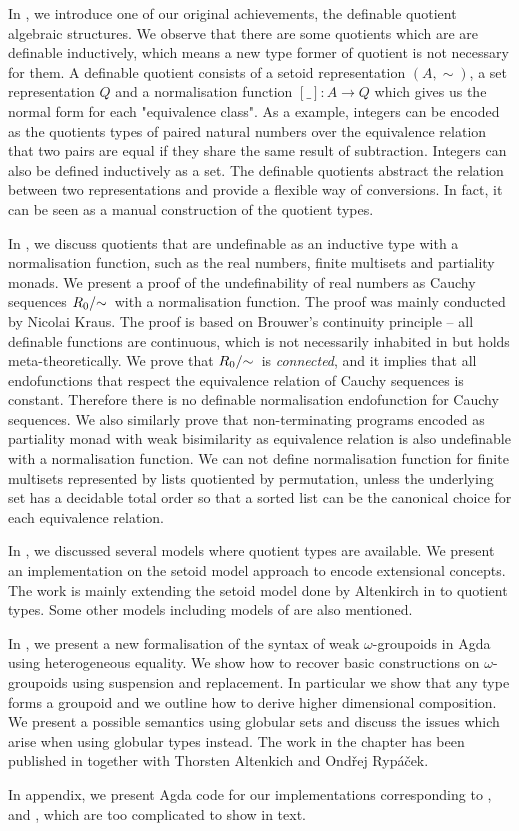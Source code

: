 In , we introduce one of our original achievements, the definable quotient algebraic structures. We observe that there are some quotients which are are definable inductively, which means a new type former of quotient is not necessary for them. A definable quotient consists of a setoid representation $(A, \sim)$, a set representation $Q$ and a normalisation function $[\_] : A \to Q$ which gives us the normal form for each "equivalence class".
As a example, integers can be encoded as the
quotients types of paired natural numbers over the equivalence
relation that two pairs are equal if they share the same result of
subtraction. Integers can also be defined inductively as a set. The definable quotients abstract the relation between two representations and provide a flexible way of conversions. In fact, it can be seen as a manual construction of the quotient types.


In , we discuss quotients that are undefinable as an inductive type with a normalisation function, such as the real numbers, finite multisets and partiality monads. We present a proof of the undefinability of real numbers as Cauchy sequences $\qset{R_0}$ with a normalisation function. The proof was mainly conducted by Nicolai Kraus. The proof is based on Brouwer's continuity principle -- all definable functions are continuous, which is not necessarily inhabited in \mltt but holds meta-theoretically. We prove that $\qset{R_0}$ is \emph{connected}, and it implies that all endofunctions that respect the equivalence relation of Cauchy sequences is constant. Therefore there is no definable normalisation endofunction for Cauchy sequences. We also similarly prove that non-terminating programs encoded as partiality monad with weak bisimilarity as equivalence relation is also undefinable with a normalisation function. We can not define normalisation function for finite multisets represented by lists quotiented by permutation, unless the underlying set has a decidable total order so that a sorted list can be the canonical choice for each equivalence relation.

In , we discussed several models where quotient types are available. We present an implementation on the setoid model approach to encode
extensional concepts. The work is mainly extending the setoid model
done by Altenkirch in \cite{alti:lics99} to
quotient types. Some other models including models of \hott are also mentioned.


In , we present a new formalisation of the syntax of weak
  $\omega$-groupoids in Agda using heterogeneous equality. We show how
  to recover basic constructions on $\omega$-groupoids using
  suspension and replacement. In particular we show that any type
  forms a groupoid and we outline how to derive higher dimensional
  composition. We present a possible semantics using globular sets and
  discuss the issues which arise when using globular types instead. The work in the chapter has been published in \cite{LFMTP14} together with Thorsten Altenkich and Ond\v{r}ej Ryp\'{a}\v{c}ek.


In appendix, we present Agda code for our implementations corresponding to ,  and , which are too complicated to show in text.
